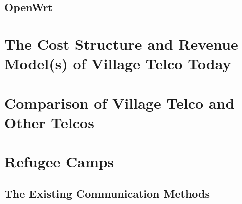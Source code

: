 
\subsection{OpenWrt}

\section{The Cost Structure and Revenue Model(s) of Village Telco Today}

\section{Comparison of Village Telco and Other Telcos}

\section{Refugee Camps}
\subsection{The Existing Communication Methods}